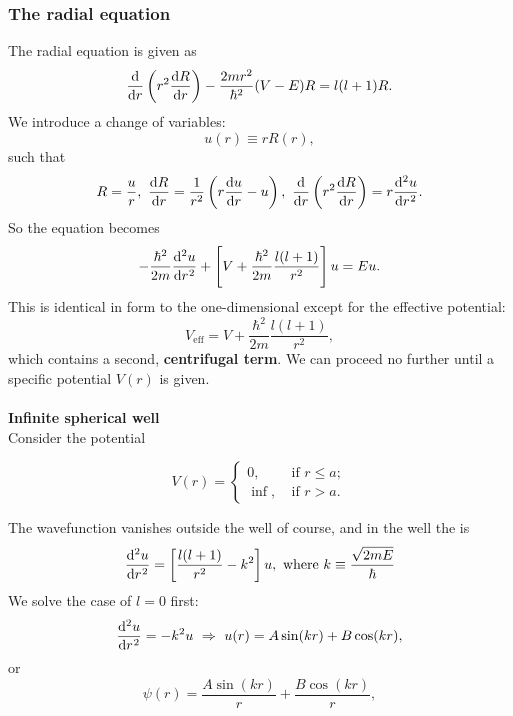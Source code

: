 \subsubsection{The radial equation}
\label{sec_radeq}
The radial equation is given as 
\begin{equation}
\diff{}{r}\lf(r^2\diff Rr \rt)-\frac{2mr^2}{\hbar^2}(V-E)R=l(l+1)R.
\end{equation}
We introduce a change of variables: 
\begin{equation}
u(r)\equiv rR(r), 
\end{equation}
such that
\begin{equation}
R=\frac{u}{r},\ \diff Rr=\frac{1}{r^2}\lf(r\diff ur-u \rt),\ \diff{}{r}\lf(r^2 \diff Rr \rt)=r\diff[2] ur. 
\end{equation}
So the equation becomes 
\begin{equation}
-\frac{\hbar^2}{2m}\diff[2] ur+\lf[V+\frac{\hbar^2}{2m}\frac{l(l+1)}{r^2} \rt]u=Eu. 
\end{equation}
This is identical in form to the one-dimensional \sch except for the 
effective potential: 
\begin{equation}
V_{\text{eff}}=V+\frac{\hbar^2}{2m}\frac{l(l+1)}{r^2}, 
\end{equation}
which contains a second, \textbf{centrifugal term}. We can proceed no further 
until a specific potential $V(r)$ is given. \\
\ \\
\textbf{Infinite spherical well}\\
Consider the potential
\begin{singlespace}
\begin{equation}
V(r)=
\begin{cases}
0,\ &\text{if }r\leq a;\\
\inf,\ &\text{if }r>a.
\end{cases}
\end{equation}
\end{singlespace}
The wavefunction vanishes outside the well of course, and in the well 
the \sch is 
\begin{equation}
\diff[2] ur=\lf[\frac{l(l+1)}{r^2}-k^2 \rt]u,\ \text{where }k\equiv\frac{\sqrt{2mE}}{\hbar}
\end{equation}
We solve the case of $l=0$ first:
\begin{equation}
\diff[2] ur=-k^2u\ \imp\ u(r)=A\sin(kr)+B\cos(kr),
\end{equation}
or
\begin{equation}
\psi(r)=\frac{A\sin(kr)}{r}+\frac{B\cos(kr)}{r},
\end{equation}

